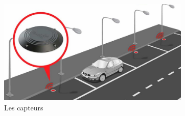\begin{figure}[H]
	\centering
	\includegraphics[height=05cm]{img/ch1-sensor-01.jpg}
	\caption{Les capteurs}
 \label{ch1sensor}
\end{figure}





